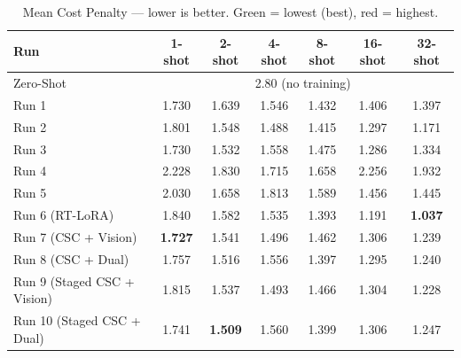 \documentclass[letterpaper,11pt,leqno]{article}
\begin{document}
\begin{table}[H]
\centering
\caption{Mean Cost Penalty --- lower is better.
\colorbox{bestgreen}{Green} = lowest (best), \colorbox{worstred}{red} = highest.}
\small
\begin{tabular}{lcccccc}
\toprule
\textbf{Run} & \textbf{1-shot} & \textbf{2-shot} & \textbf{4-shot}
             & \textbf{8-shot} & \textbf{16-shot} & \textbf{32-shot} \\
\midrule
Zero-Shot & \multicolumn{6}{c}{2.80 (no training)} \\
\midrule
Run 1 & 1.730 & 1.639 & 1.546 & 1.432 & 1.406 & 1.397 \\
Run 2 & 1.801 & 1.548 & \cellcolor{bestgreen}1.488 & 1.415 & 1.297 & 1.171 \\
Run 3 & 1.730 & 1.532 & 1.558 & 1.475 & 1.286 & 1.334 \\
Run 4 & \cellcolor{worstred}2.228 & \cellcolor{worstred}1.830 & \cellcolor{worstred}1.715 & \cellcolor{worstred}1.658 & \cellcolor{worstred}2.256 & \cellcolor{worstred}1.932 \\
Run 5 & 2.030 & 1.658 & 1.813 & 1.589 & 1.456 & 1.445 \\
Run 6 (RT-LoRA) & 1.840 & 1.582 & 1.535 & \cellcolor{bestgreen}1.393 & \cellcolor{bestgreen}1.191 & \cellcolor{bestgreen}\textbf{1.037} \\
Run 7 (CSC + Vision) & \cellcolor{bestgreen}\textbf{1.727} & 1.541 & 1.496 & 1.462 & 1.306 & 1.239 \\
Run 8 (CSC + Dual)   & 1.757 & 1.516 & 1.556 & 1.397 & 1.295 & 1.240 \\
Run 9 (Staged CSC + Vision) & 1.815 & 1.537 & 1.493 & 1.466 & 1.304 & 1.228 \\
Run 10 (Staged CSC + Dual)  & 1.741 & \cellcolor{bestgreen}\textbf{1.509} & 1.560 & 1.399 & 1.306 & 1.247 \\
\bottomrule
\end{tabular}
\end{table}
\end{document}
